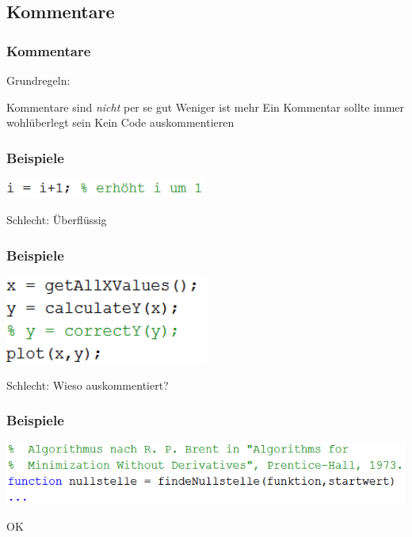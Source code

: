 \documentclass{beamer}
\begin{document}
\subsection{Kommentare}
\begin{frame}
    \frametitle{Kommentare}
    Grundregeln:

    \begin{outline}
        \pause
        \1 Kommentare sind \emph{nicht} per se gut
        \pause
        \1 Weniger ist mehr
        \pause
        \1 Ein Kommentar sollte immer wohlüberlegt sein
        \pause
        \1 Kein Code auskommentieren
    \end{outline}
\end{frame}
\begin{frame}
    \frametitle{Beispiele}
        \begin{center}
    \includegraphics[width=0.5\textwidth]{pictures/Kommentare3.PNG}

    \pause
    \vspace{2em}
            \huge \color{red} Schlecht: Überflüssig
        \end{center}
\end{frame}
\begin{frame}
    \frametitle{Beispiele}
        \begin{center}
    \includegraphics[width=0.5\textwidth]{pictures/Kommentare4.PNG}

    \pause
    \vspace{2em}
            \huge \color{red} Schlecht: Wieso auskommentiert?
        \end{center}
\end{frame}
\begin{frame}
    \frametitle{Beispiele}
        \begin{center}
    \includegraphics[width=\textwidth]{pictures/Kommentare2.PNG}

    \pause
    \vspace{2em}
            \huge \color{green} OK
        \end{center}
\end{frame}
\end{document}
